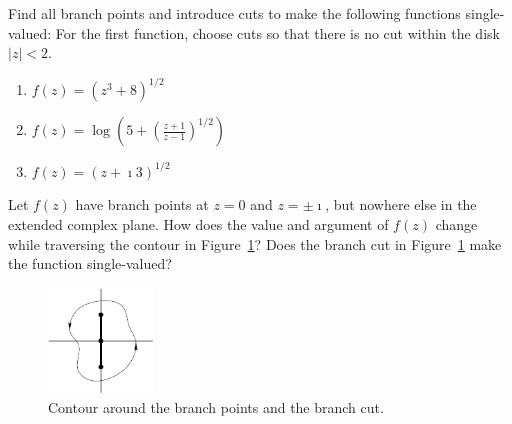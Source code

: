 {\begin{Exercise}
\end{Exercise}







\begin{Exercise}
  \label{exercise z3812}
  Find all branch points and introduce cuts to make the following functions
  single-valued:  For the first function, choose cuts so that there is 
  no cut within the disk $|z| < 2$.
  \begin{enumerate}
  \item $\displaystyle f(z) = \left( z^3 + 8 \right)^{1/2}$
  \item $\displaystyle f(z) 
    = \log \left( 5 + \left( \frac{z+1}{z-1} \right)^{1/2} \right)$
  \item $\displaystyle f(z) = (z + \imath 3)^{1/2}$
  \end{enumerate}

\end{Exercise}






\begin{Exercise}
  \label{exercise bp inf 1}
  Let $f(z)$ have branch points at $z = 0$ and $z = \pm \imath$, but nowhere else
  in the extended complex plane.  How does the value and argument of $f(z)$
  change while traversing the contour in Figure~\ref{cont_around_0pmi}?
  Does the branch cut in Figure~\ref{cont_around_0pmi} make the function 
  single-valued?
  \begin{figure}[htbp!]
    \begin{center}
      \includegraphics[width=0.25\textwidth]{fcv/function/cont_around_0pmi}
    \end{center}
    \caption{Contour around the branch points and the branch cut.}
    \label{cont_around_0pmi}
  \end{figure}

\end{Exercise}






}
